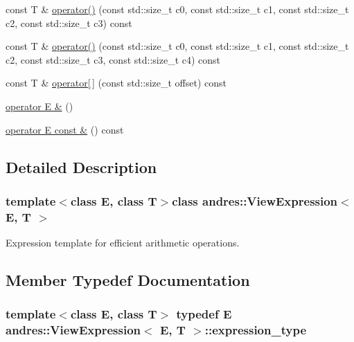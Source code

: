 \begin{DoxyCompactItemize}
const T \& \hyperlink{classandres_1_1ViewExpression_ae098a083ea9e3e07f3bb297f8d792908}{operator()} (const std\+::size\+\_\+t c0, const std\+::size\+\_\+t c1, const std\+::size\+\_\+t c2, const std\+::size\+\_\+t c3) const 
\item 
const T \& \hyperlink{classandres_1_1ViewExpression_afed1b53168bfa8af74a8806cdc0511be}{operator()} (const std\+::size\+\_\+t c0, const std\+::size\+\_\+t c1, const std\+::size\+\_\+t c2, const std\+::size\+\_\+t c3, const std\+::size\+\_\+t c4) const 
\item 
const T \& \hyperlink{classandres_1_1ViewExpression_a5623026765591cb13b9f09e207610b79}{operator\mbox{[}$\,$\mbox{]}} (const std\+::size\+\_\+t offset) const 
\item 
\hyperlink{classandres_1_1ViewExpression_a7e8ad61ca588af63869d01f8666b57e7}{operator E \&} ()
\item 
\hyperlink{classandres_1_1ViewExpression_aaa41406565c736e06ec21dabf3f32378}{operator E const \&} () const 
\end{DoxyCompactItemize}


\subsection{Detailed Description}
\subsubsection*{template$<$class E, class T$>$class andres\+::\+View\+Expression$<$ E, T $>$}

Expression template for efficient arithmetic operations. 

\subsection{Member Typedef Documentation}
\hypertarget{classandres_1_1ViewExpression_a0b26c0956d2167c6c07ba2841066d450}{}
\subsubsection[{expression\+\_\+type}]{\setlength{\rightskip}{0pt plus 5cm}template$<$class E, class T$>$ typedef E {\bf andres\+::\+View\+Expression}$<$ E, T $>$\+::{\bf expression\+\_\+type}}\label{classandres_1_1ViewExpression_a0b26c0956d2167c6c07ba2841066d450}
\hypertarget{classandres_1_1ViewExpression_aad128b08207a68e92797aa2c7342feff}{}
